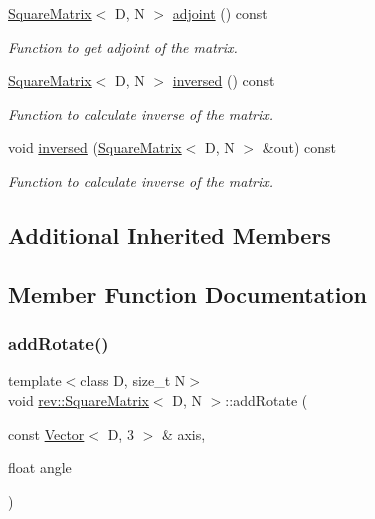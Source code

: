 \begin{DoxyCompactItemize}
\mbox{\hyperlink{classrev_1_1_square_matrix}{Square\+Matrix}}$<$ D, N $>$ \mbox{\hyperlink{classrev_1_1_square_matrix_a4b1446f9e6a8c5de08026a487a8fa9fa}{adjoint}} () const
\begin{DoxyCompactList}\small\item\em Function to get adjoint of the matrix. \end{DoxyCompactList}\item 
\mbox{\hyperlink{classrev_1_1_square_matrix}{Square\+Matrix}}$<$ D, N $>$ \mbox{\hyperlink{classrev_1_1_square_matrix_ae92cd0e8ac462fec5cfe85a19ecf00bb}{inversed}} () const
\begin{DoxyCompactList}\small\item\em Function to calculate inverse of the matrix. \end{DoxyCompactList}\item 
void \mbox{\hyperlink{classrev_1_1_square_matrix_a6a513b349ccd3b95a8d3fc52c97825f2}{inversed}} (\mbox{\hyperlink{classrev_1_1_square_matrix}{Square\+Matrix}}$<$ D, N $>$ \&out) const
\begin{DoxyCompactList}\small\item\em Function to calculate inverse of the matrix. \end{DoxyCompactList}\end{DoxyCompactItemize}
\subsection*{Additional Inherited Members}


\subsection{Member Function Documentation}
\mbox{\label{classrev_1_1_square_matrix_aa32e581d2541d5b6de2d18819a3d71e2}} 
\subsubsection{\texorpdfstring{addRotate()}{addRotate()}}
{\footnotesize\ttfamily template$<$class D, size\+\_\+t N$>$ \\
void \mbox{\hyperlink{classrev_1_1_square_matrix}{rev\+::\+Square\+Matrix}}$<$ D, N $>$\+::add\+Rotate (\begin{DoxyParamCaption}\item[{const \mbox{\hyperlink{classrev_1_1_vector}{Vector}}$<$ D, 3 $>$ \&}]{axis,  }\item[{float}]{angle }\end{DoxyParamCaption})\hspace{0.3cm}{\ttfamily [inline]}}



